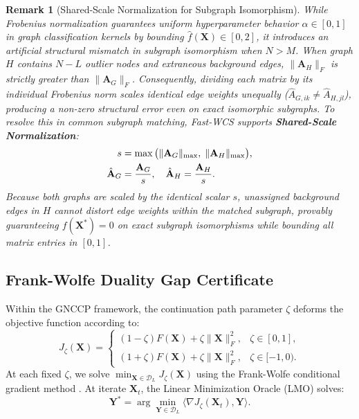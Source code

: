 \documentclass[conference]{IEEEtran}
\newtheorem{remark}{Remark}
\begin{document}
\begin{remark}[Shared-Scale Normalization for Subgraph Isomorphism]
While Frobenius normalization guarantees uniform hyperparameter behavior $\alpha \in [0, 1]$ in graph classification kernels by bounding $\hat{f}(\mathbf{X}) \in [0, 2]$, it introduces an artificial structural mismatch in subgraph isomorphism when $N > M$. When graph $H$ contains $N - L$ outlier nodes and extraneous background edges, $\|\mathbf{A}_H\|_F$ is strictly greater than $\|\mathbf{A}_G\|_F$. Consequently, dividing each matrix by its individual Frobenius norm scales identical edge weights unequally ($\hat{A}_{G, ik} \neq \hat{A}_{H, jl}$), producing a non-zero structural error even on exact isomorphic subgraphs. To resolve this in common subgraph matching, Fast-WCS supports \textbf{Shared-Scale Normalization}:
\begin{align}
s &= \max\big( \|\mathbf{A}_G\|_{\max}, \; \|\mathbf{A}_H\|_{\max} \big), \notag\\
\hat{\mathbf{A}}_G &= \frac{\mathbf{A}_G}{s}, \quad \hat{\mathbf{A}}_H = \frac{\mathbf{A}_H}{s}.
\label{eq:shared_scale}
\end{align}
Because both graphs are scaled by the identical scalar $s$, unassigned background edges in $H$ cannot distort edge weights within the matched subgraph, provably guaranteeing $f(\mathbf{X}^*) = 0$ on exact subgraph isomorphisms while bounding all matrix entries in $[0, 1]$.
\end{remark}

\subsection{Frank-Wolfe Duality Gap Certificate}

Within the GNCCP framework, the continuation path parameter $\zeta$ deforms the objective function according to:
\begin{equation}
J_\zeta(\mathbf{X}) = \begin{cases}
(1 - \zeta)F(\mathbf{X}) + \zeta\|\mathbf{X}\|_F^2, & \zeta \in [0, 1], \\
(1 + \zeta)F(\mathbf{X}) + \zeta\|\mathbf{X}\|_F^2, & \zeta \in [-1, 0).
\end{cases}
\label{eq:Jzeta_def}
\end{equation}
At each fixed $\zeta$, we solve $\min_{\mathbf{X} \in \mathcal{D}_L} J_\zeta(\mathbf{X})$ using the Frank-Wolfe conditional gradient method \cite{frank1956algorithm, jaggi2013revisiting}. At iterate $\mathbf{X}_t$, the Linear Minimization Oracle (LMO) solves:
\begin{equation}
\mathbf{Y}^* = \arg\min_{\mathbf{Y} \in \mathcal{D}_L} \big\langle \nabla J_\zeta(\mathbf{X}_t), \mathbf{Y} \big\rangle.
\label{eq:lmo_def}
\end{equation}
\end{document}
